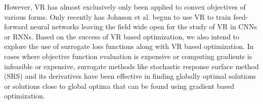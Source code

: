 \documentclass{article} %
\begin{document}
However, VR has almost exclusively only been applied to convex objectives of various forms. Only recently has Johnson et al. begun to use VR to train feed-forward neural networks \cite{JohnsonZhang2013-SVRG} leaving the field wide open for the study of VR in CNNs or RNNs. Based on the success of VR based optimization, we also intend to explore the use of surrogate loss functions along with VR based optimization. In cases where objective function evaluation is expensive or computing gradients is infeasible or expensive, surrogate methods like stochastic response surface method (SRS) and its derivatives \cite{regis-2007} have been effective in finding globally optimal solutions or solutions close to global optima that can be found using gradient based optimization.


\end{document}
